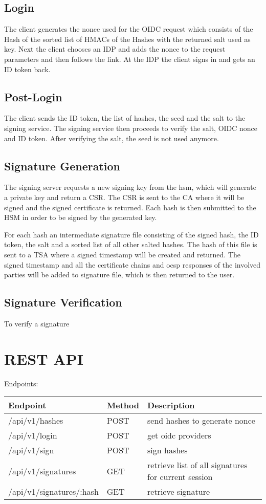 \subsection{Login}
The client generates the nonce used for the \gls{OIDC} request which consists of the Hash of the sorted list of \gls{HMAC}s of the Hashes with the returned salt used as key. 
Next the client chooses an \gls{IDP} and adds the nonce to the request parameters and then follows the link. At the \gls{IDP} the client signs in and gets an ID token back.

\subsection{Post-Login}
The client sends the ID token, the list of hashes, the seed and the salt to the signing service. The signing service then proceeds to verify the salt, OIDC nonce and ID token.
After verifying the salt, the seed is not used anymore.

\subsection{Signature Generation}
The signing server requests a new signing key from the hsm, which will generate a private key and return a \gls{CSR}.
The \gls{CSR} is sent to the \gls{CA} where it will be signed and the signed certificate is returned.
Each hash is then submitted to the \gls{HSM} in order to be signed by the generated key.

For each hash an intermediate signature file consisting of the signed hash, the ID token, the salt and a sorted list of all other salted hashes.
The hash of this file is sent to a \gls{TSA} where a signed timestamp will be created and returned.
The signed timestamp and all the certificate chains and ocsp responses of the involved parties will be added to signature file, which is then returned to the user.

\subsection{Signature Verification}
To verify a signature 

\section{REST API}
Endpoints:

\begin{tabular}{|l|l|l|}
	\hline
	Endpoint & Method & Description \\ \hline
	/api/v1/hashes & POST & send hashes to generate nonce \\ \hline
	/api/v1/login & POST & get oidc providers \\ \hline
	/api/v1/sign & POST & sign hashes \\ \hline
	/api/v1/signatures & GET & retrieve list of all signatures for current session \\ \hline
	/api/v1/signatures/:hash & GET & retrieve signature \\ \hline
\end{tabular}

